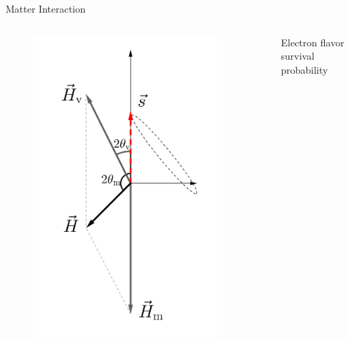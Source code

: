 \begin{frame}{Matter Interaction}



\begin{columns}[T]
\begin{column}{0.5\textwidth}


\begin{figure}
    \centering
    \colorbox{white}{\includegraphics[width=0.9\textwidth]{assets/matter-effect-notsolarge-density}}
\end{figure}


\end{column}%
\begin{column}{0.5\textwidth}



Electron flavor survival probability


\end{column}
\end{columns}
\end{frame}
